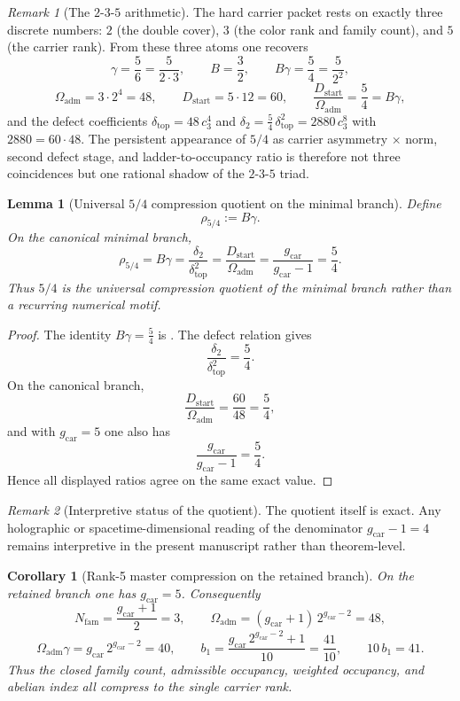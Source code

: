 \documentclass[11pt,a4paper]{article}
\newtheorem{corollary}[theorem]{Corollary}
\newtheorem{lemma}[theorem]{Lemma}
\theoremstyle{definition}
\theoremstyle{remark}
\newtheorem*{remark}{Remark}
\newcommand{\cthree}{c_3}
\newcommand{\deltatop}{\delta_{\mathrm{top}}}
\newcommand{\bone}{b_1}
\newcommand{\Oadm}{\Omega_{\mathrm{adm}}}
\newcommand{\gcar}{g_{\mathrm{car}}}
\newcommand{\Dstart}{D_{\mathrm{start}}}
\begin{document}
\begin{remark}[The $2$-$3$-$5$ arithmetic]
The hard carrier packet rests on exactly three discrete numbers: $2$ (the double cover), $3$ (the color rank and family count), and $5$ (the carrier rank). From these three atoms one recovers
\[
\gamma=\frac{5}{6}=\frac{5}{2\cdot 3},
\qquad
B=\frac{3}{2},
\qquad
B\gamma=\frac{5}{4}=\frac{5}{2^2},
\]
\[
\Oadm=3\cdot 2^4=48,
\qquad
\Dstart=5\cdot 12=60,
\qquad
\frac{\Dstart}{\Oadm}=\frac{5}{4}=B\gamma,
\]
and the defect coefficients $\deltatop=48\,\cthree^4$ and $\delta_2=\frac54\,\deltatop^2=2880\,\cthree^8$ with $2880=60\cdot 48$.
The persistent appearance of $5/4$ as carrier asymmetry $\times$ norm, second defect stage, and ladder-to-occupancy ratio is therefore not three coincidences but one rational shadow of the $2$-$3$-$5$ triad.
\end{remark}

\begin{lemma}[Universal \texorpdfstring{$5/4$}{5/4} compression quotient on the minimal branch]
\label{lem:universal-5-4-compression}
Define
\[
\rho_{5/4}:=B\gamma.
\]
On the canonical minimal branch,
\[
\rho_{5/4}
=
B\gamma
=
\frac{\delta_2}{\deltatop^2}
=
\frac{\Dstart}{\Oadm}
=
\frac{\gcar}{\gcar-1}
=
\frac54.
\]
Thus $5/4$ is the universal compression quotient of the minimal branch rather than a recurring numerical motif.
\end{lemma}

\begin{proof}
The identity $B\gamma=\frac54$ is . The defect relation gives
\[
\frac{\delta_2}{\deltatop^2}=\frac54.
\]
On the canonical branch,
\[
\frac{\Dstart}{\Oadm}=\frac{60}{48}=\frac54,
\]
and with $\gcar=5$ one also has
\[
\frac{\gcar}{\gcar-1}=\frac{5}{4}.
\]
Hence all displayed ratios agree on the same exact value.
\end{proof}

\begin{remark}[Interpretive status of the quotient]
The quotient itself is exact. Any holographic or spacetime-dimensional reading of the denominator $\gcar-1=4$ remains interpretive in the present manuscript rather than theorem-level.
\end{remark}

\begin{corollary}[Rank-5 master compression on the retained branch]
\label{cor:rank-5-master-compression}
On the retained branch one has $\gcar=5$. Consequently
\[
N_{\mathrm{fam}}=\frac{\gcar+1}{2}=3,
\qquad
\Oadm=(\gcar+1)\,2^{\gcar-2}=48,
\]
\[
\Oadm\gamma=\gcar\,2^{\gcar-2}=40,
\qquad
\bone=\frac{\gcar\,2^{\gcar-2}+1}{10}=\frac{41}{10},
\qquad
10\,\bone=41.
\]
Thus the closed family count, admissible occupancy, weighted occupancy, and abelian index all
compress to the single carrier rank.
\end{corollary}
\end{document}
